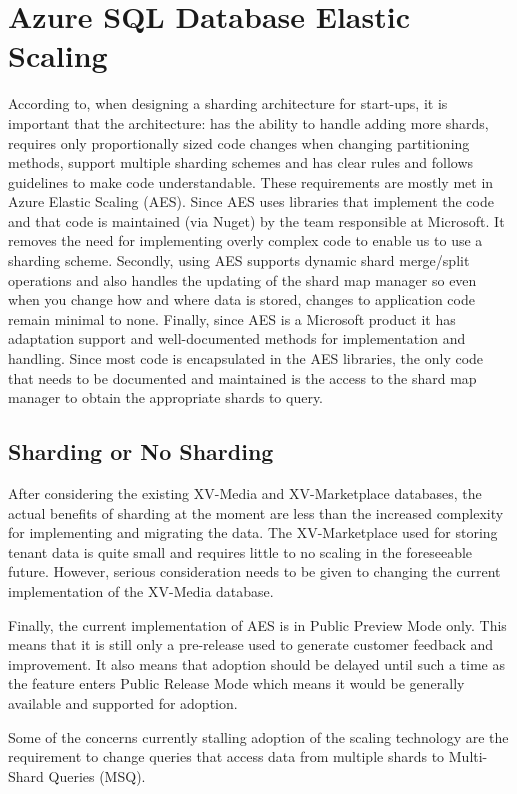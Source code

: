  
 \section{Azure SQL Database Elastic Scaling}
 
According to\cite{Ries2009-td}, when designing a sharding architecture for start-ups, it is important that the architecture: has the ability to handle adding more shards, requires only proportionally sized code changes when changing partitioning methods, support multiple sharding schemes and has clear rules and follows guidelines to make code understandable.
These requirements are mostly met in Azure Elastic Scaling (AES). Since AES uses libraries that implement the code and that code is maintained (via Nuget) by the team responsible at Microsoft. It removes the need for implementing overly complex code to enable us to use a sharding scheme. Secondly, using AES supports dynamic shard merge/split operations and also handles the updating of the shard map manager so even when you change how and where data is stored, changes to application code remain minimal to none. Finally, since AES is a Microsoft product it has adaptation support and well-documented methods for implementation and handling. Since most code is encapsulated in the AES libraries, the only code that needs to be documented and maintained is the access to the shard map manager to obtain the appropriate shards to query.

\subsection{Sharding or No Sharding}

After considering the existing XV-Media and XV-Marketplace databases, the actual benefits of sharding at the moment are less than the increased complexity for implementing and migrating the data. The XV-Marketplace used for storing tenant data is quite small and requires little to no scaling in the foreseeable future. However, serious consideration needs to be given to changing the current implementation of the XV-Media database.
 
Finally, the current implementation of AES is in Public Preview Mode only. This means that it is still only a pre-release used to generate customer feedback and improvement. It also means that adoption should be delayed until such a time as the feature enters Public Release Mode which means it would be generally available and supported for adoption.
 
Some of the concerns currently stalling adoption of the scaling technology are the requirement to change queries that access data from multiple shards to Multi-Shard Queries (MSQ).

